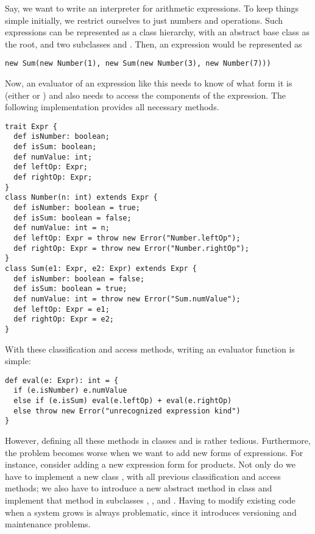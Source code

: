 Say, we want to write an interpreter for arithmetic expressions.  To
keep things simple initially, we restrict ourselves to just numbers
and \code{+} operations. Such expressions can be represented as a class hierarchy, with an abstract base class  as the root, and two subclasses  and
. Then, an expression  would be represented as
\begin{lstlisting}
new Sum(new Number(1), new Sum(new Number(3), new Number(7)))
\end{lstlisting}
Now, an evaluator of an expression like this needs to know of what
form it is (either  or ) and also needs to
access the components of the expression.  The following
implementation provides all necessary methods.
\begin{lstlisting}
trait Expr {
  def isNumber: boolean;
  def isSum: boolean;
  def numValue: int;
  def leftOp: Expr;
  def rightOp: Expr;
}
class Number(n: int) extends Expr {
  def isNumber: boolean = true;
  def isSum: boolean = false;
  def numValue: int = n;
  def leftOp: Expr = throw new Error("Number.leftOp");
  def rightOp: Expr = throw new Error("Number.rightOp");
}
class Sum(e1: Expr, e2: Expr) extends Expr {
  def isNumber: boolean = false;
  def isSum: boolean = true;
  def numValue: int = throw new Error("Sum.numValue");
  def leftOp: Expr = e1;
  def rightOp: Expr = e2;
}
\end{lstlisting}
With these classification and access methods, writing an evaluator function is simple:
\begin{lstlisting}
def eval(e: Expr): int = {
  if (e.isNumber) e.numValue
  else if (e.isSum) eval(e.leftOp) + eval(e.rightOp)
  else throw new Error("unrecognized expression kind")
}
\end{lstlisting}
However, defining all these methods in classes  and
 is rather tedious. Furthermore, the problem becomes worse 
when we want to add new forms of expressions. For instance, consider
adding a new expression form
 for products. Not only do we have to implement a new class , with all previous classification and access methods; we also have to introduce a
new abstract method  in class  and
implement that method in subclasses , , and
. Having to modify existing code when a system grows is always problematic, since it introduces versioning and maintenance problems. 

